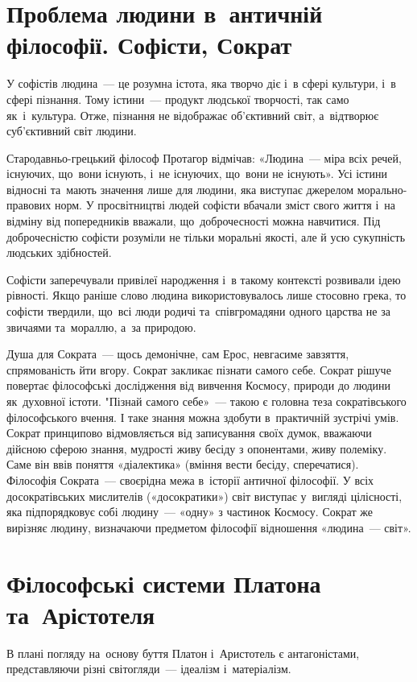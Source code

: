 \documentclass[a5paper,oneside,DIV=12,12pt,headings=small]{scrartcl}
\begin{document}
	\section{Проблема людини в~античній філософії. Софісти, Сократ}
		У софістів людина~— це розумна істота, яка творчо діє і~в сфері культури, і~в сфері пізнання. Тому істини~— продукт людської творчості, так само як~і~культура. Отже, пізнання не відображає об'\-єк\-тив\-ний світ, а~відтворює суб'єктивний світ людини.

		Стародавньо-грецький філософ Протагор відмічав: «Людина~— міра всіх речей, існуючих, що~вони існують, і~не існуючих, що~вони не існують». Усі істини відносні та~мають значення лише для людини, яка виступає джерелом морально-правових норм. У просвітництві людей софісти вбачали зміст свого життя і~на відміну від попередників вважали, що~доброчесності можна навчитися. Під доброчесністю софісти розуміли не тільки моральні якості, але й усю сукупність людських здібностей.
		
		Софісти заперечували привілеї народження і~в такому контексті розвивали ідею рівності. Якщо раніше слово людина використовувалось лише стосовно грека, то софісти твердили, що~всі люди родичі та~співгромадяни одного царства не за звичаями та~мораллю, а~за природою.
		
		Душа для Сократа~— щось демонічне, сам Ерос, невгасиме завзяття, спрямованість йти вгору. Сократ закликає пізнати самого себе.
		Сократ рішуче повертає філософські дослідження від вивчення Космосу, природи до людини як~духовної істоти. "Пізнай самого себе»~— такою є головна теза сократівського філософського вчення. І таке знання можна здобути в~практичній зустрічі умів. Сократ принципово відмовляється від записування своїх думок, вважаючи дійсною сферою знання, мудрості живу бесіду з опонентами, живу полеміку. Саме він ввів поняття «діалектика» (вміння вести бесіду, сперечатися).
		Філософія Сократа~— своєрідна межа в~історії античної філософії. У всіх досократівських мислителів («досократики») світ виступає у~вигляді цілісності, яка підпорядковує собі людину~— «одну» з частинок Космосу. Сократ же вирізняє людину, визначаючи предметом філософії відношення «людина~— світ».
		
	\section{Філософські системи Платона та~Арістотеля}
		В плані погляду на~основу буття Платон і~Аристотель є антагоністами, представляючи різні світогляди~— ідеалізм і~матеріалізм.
\end{document}
